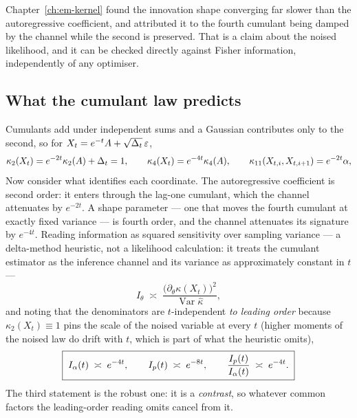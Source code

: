 Chapter~\ref{ch:em-kernel} found the innovation shape converging far slower than
the autoregressive coefficient, and attributed it to the fourth cumulant being
damped by the channel while the second is preserved. That is a claim about the
noised likelihood, and it can be checked directly against Fisher information,
independently of any optimiser.

\subsection{What the cumulant law predicts}

Cumulants add under independent sums and a Gaussian contributes only to the
second, so for $X_t = e^{-t}A + \sqrt{\Delta_t}\,\varepsilon$,
\begin{equation}
  \kappa_2(X_t) = e^{-2t}\kappa_2(A) + \Delta_t = 1,
  \qquad
  \kappa_4(X_t) = e^{-4t}\kappa_4(A),
  \qquad
  \kappa_{11}(X_{t,i}, X_{t,i+1}) = e^{-2t}\alpha,
  \label{eq:em-cumulants}
\end{equation}
 Now consider what identifies each
coordinate. The autoregressive coefficient is second order: it enters through
the lag-one cumulant, which the channel attenuates by $e^{-2t}$. A shape
parameter --- one that moves the fourth cumulant at exactly fixed variance --- is
fourth order, and the channel attenuates its signature by $e^{-4t}$. Reading
information as squared sensitivity over sampling variance --- a delta-method
heuristic, not a likelihood calculation: it treats the cumulant estimator as
the inference channel and its variance as approximately constant in $t$ ---
\begin{equation}
  I_\theta \;\asymp\;
  \frac{\big(\partial_\theta \kappa(X_t)\big)^2}{\operatorname{Var}\widehat{\kappa}},
\end{equation}
and noting that the denominators are $t$-independent \emph{to leading order}
because
$\kappa_2(X_t) \equiv 1$ pins the scale of the noised variable at every $t$
(higher moments of the noised law do drift with $t$, which is part of what the
heuristic omits),
\begin{equation}
  \boxed{\;
  I_{\alpha}(t) \;\asymp\; e^{-4t},
  \qquad
  I_{p}(t) \;\asymp\; e^{-8t},
  \qquad
  \frac{I_{p}(t)}{I_{\alpha}(t)} \;\asymp\; e^{-4t}.
  \;}
  \label{eq:em-info-prediction}
\end{equation}
The third statement is the robust one: it is a \emph{contrast}, so whatever
common factors the leading-order reading omits cancel from it.

